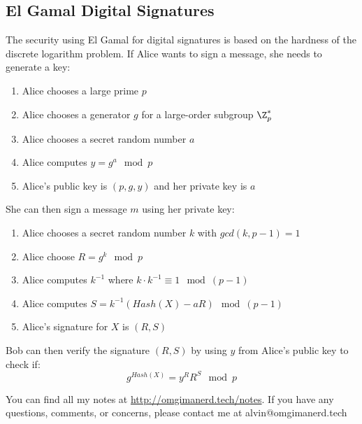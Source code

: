 \documentclass{math}
\begin{document}
\subsection*{El Gamal Digital Signatures}
The security using El Gamal for digital signatures is based on the hardness of
the discrete logarithm problem. If Alice wants to sign a message, she needs to
generate a key:
\begin{enumerate}
  \item Alice chooses a large prime \( p \)
  \item Alice chooses a generator \( g \) for a large-order subgroup
  \( \Z_p^* \)
  \item Alice chooses a secret random number \( a \)
  \item Alice computes \( y = g^a\mod p \)
  \item Alice's public key is \( (p,g,y) \) and her private key is \( a \)
\end{enumerate}
She can then sign a message \( m \) using her private key:
\begin{enumerate}
  \item Alice chooses a secret random number \( k \) with \( gcd(k,p-1) = 1 \)
  \item Alice choose \( R = g^k\mod p \)
  \item Alice computes \( k^{-1} \) where \( k\cdot k^{-1}\equiv1\mod(p-1) \)
  \item Alice computes \( S = k^{-1}(Hash(X)-aR)\mod(p-1) \)
  \item Alice's signature for \( X \) is \( (R,S) \)
\end{enumerate}
Bob can then verify the signature \( (R,S) \) by using \( y \) from Alice's
public key to check if:
\[ g^{Hash(X)} = y^RR^S\mod p \]

\begin{center}
  You can find all my notes at \url{http://omgimanerd.tech/notes}. If you have
  any questions, comments, or concerns, please contact me at
  alvin@omgimanerd.tech
\end{center}
\end{document}
